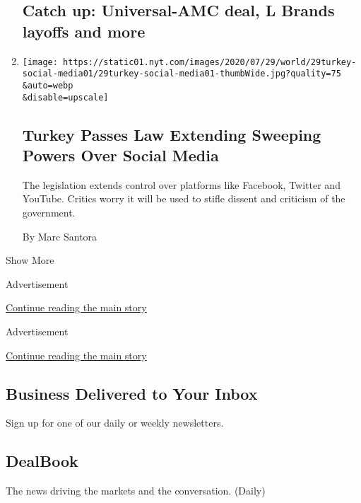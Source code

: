 \begin{enumerate}
  \hypertarget{catch-up-universal-amc-deal-l-brands-layoffs-and-more}{%
  \subsection{Catch up: Universal-AMC deal, L Brands layoffs and
  more}\label{catch-up-universal-amc-deal-l-brands-layoffs-and-more}}
\item
  \href{/2020/07/29/world/europe/turkey-social-media-control.html}{}

  \texttt{[image: https://static01.nyt.com/images/2020/07/29/world/29turkey-social-media01/29turkey-social-media01-thumbWide.jpg?quality=75\\\&auto=webp\\\&disable=upscale]}

  \hypertarget{turkey-passes-law-extending-sweeping-powers-over-social-media}{%
  \subsection{Turkey Passes Law Extending Sweeping Powers Over Social
  Media}\label{turkey-passes-law-extending-sweeping-powers-over-social-media}}

  The legislation extends control over platforms like Facebook, Twitter
  and YouTube. Critics worry it will be used to stifle dissent and
  criticism of the government.

  By Marc Santora
\end{enumerate}

Show More

Advertisement

\protect\hyperlink{after-mid2}{Continue reading the main story}

Advertisement

\protect\hyperlink{after-mktg}{Continue reading the main story}

\hypertarget{business-delivered-to-your-inbox}{%
\subsection{Business Delivered to Your
Inbox}\label{business-delivered-to-your-inbox}}

Sign up for one of our daily or weekly newsletters.

\hypertarget{dealbook}{%
\subsection{DealBook}\label{dealbook}}

The news driving the markets and the conversation. (Daily)

